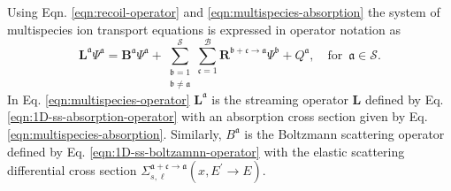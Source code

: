 Using Eqn. \eqref{eqn:recoil-operator} and \eqref{eqn:multispecies-absorption} the system of multispecies ion transport equations is expressed in operator notation as
\begin{equation} \label{eqn:multispecies-operator}
  \boldsymbol{L}^{\mathfrak{a}} \Psi^{\mathfrak{a}} = \boldsymbol{B}^{\mathfrak{a}} \Psi^{\mathfrak{a}} + \sum_{\substack{\mathfrak{b} = 1 \\ \mathfrak{b} \neq \mathfrak{a}}}^{\mathcal{S}} \sum_{\mathfrak{c} = 1}^{\mathcal{B}} \boldsymbol{R}^{\mathfrak{b} + \mathfrak{c} \rightarrow \mathfrak{a}} \Psi^{\mathfrak{b}} + Q^{\mathfrak{a}}, \quad \text{for} \,\,\, \mathfrak{a} \in \mathcal{S}.
\end{equation}
In Eq. \eqref{eqn:multispecies-operator} $\boldsymbol{L}^{\mathfrak{a}}$ is the streaming operator $\boldsymbol{L}$ defined by Eq. \eqref{eqn:1D-ss-absorption-operator} with an absorption cross section given by Eq. \eqref{eqn:multispecies-absorption}. Similarly, $B^{\mathfrak{a}}$ is the Boltzmann scattering operator defined by Eq. \eqref{eqn:1D-ss-boltzamnn-operator} with the elastic scattering differential cross section $\Sigma_{s,\ell}^{\mathfrak{a} + \mathfrak{c} \rightarrow \mathfrak{a}}(x, E^{\prime}\rightarrow E)$. 

